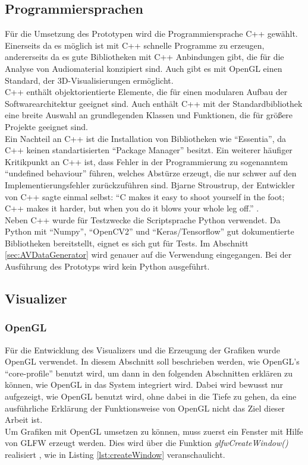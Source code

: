 \documentclass[11pt,a4paper]{article}
\begin{document}
\subsection{Programmiersprachen}
Für die Umsetzung des Prototypen wird die Programmiersprache C++ gewählt. Einerseits da es möglich ist mit C++ schnelle Programme zu erzeugen, andererseits da es gute Bibliotheken mit C++ Anbindungen gibt, die für die Analyse von Audiomaterial konzipiert sind. Auch gibt es mit OpenGL einen Standard, der 3D-Visualisierungen ermöglicht.\\
C++ enthält objektorientierte Elemente, die für einen modularen Aufbau der Softwarearchitektur geeignet sind. Auch enthält C++ mit der Standardbibliothek eine breite Auswahl an grundlegenden Klassen und Funktionen, die für größere Projekte geeignet sind.\\
Ein Nachteil an C++ ist die Installation von Bibliotheken wie ``Essentia'', da C++ keinen standartisierten ``Package Manager'' besitzt. Ein weiterer häufiger Kritikpunkt an C++ ist, dass Fehler in der Programmierung zu sogenanntem ``undefined behaviour'' führen, welches Abstürze erzeugt, die nur schwer auf den Implementierungsfehler zurückzuführen sind. Bjarne Stroustrup, der Entwickler von C++ sagte einmal selbst: ``C makes it easy to shoot yourself in the foot; C++ makes it harder, but when you do it blows your whole leg off.'' \cite{BjarneStroustrupCite}.\\
Neben C++ wurde für Testzwecke die Scriptsprache Python verwendet. Da Python mit ``Numpy'', ``OpenCV2'' und ``Keras/Tensorflow'' gut dokumentierte Bibliotheken bereitstellt, eignet es sich gut für Tests. Im Abschnitt \ref{sec:AVDataGenerator} wird genauer auf die Verwendung eingegangen. Bei der Ausführung des Prototyps wird kein Python ausgeführt.

\subsection{Visualizer}

\subsubsection{OpenGL}
Für die Entwicklung des Visualizers und die Erzeugung der Grafiken wurde OpenGL verwendet. In diesem Abschnitt soll beschrieben werden, wie OpenGL's ``core-profile'' benutzt wird, um dann in den folgenden Abschnitten erklären zu können, wie OpenGL in das System integriert wird. Dabei wird bewusst nur aufgezeigt, wie OpenGL benutzt wird, ohne dabei in die Tiefe zu gehen, da eine ausführliche Erklärung der Funktionsweise von OpenGL nicht das Ziel dieser Arbeit ist.\\
Um Grafiken mit OpenGL umsetzen zu können, muss zuerst ein Fenster mit Hilfe von GLFW erzeugt werden. Dies wird über die Funktion \mbox{\textit{glfwCreateWindow()}} realisiert \cite[Hello-Window]{LearnOpenGL}, wie in Listing \ref{lst:createWindow} veranschaulicht.
\end{document}
